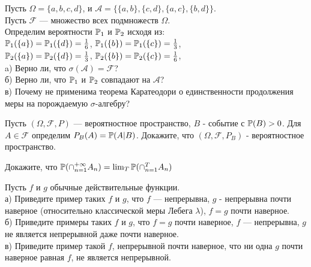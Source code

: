\begin{problem}
Пусть $\Omega=\{a,b,c,d\}$, и
$\mathcal{A}=\{\{a,b\},\{c,d\},\{a,c\},\{b,d\}\}$. \\
Пусть $\mathcal{F}$ --- множество всех подмножеств $\Omega$. \\
Определим вероятности $\P_{1}$ и $\P_{2}$ исходя
из: \\
$\P_{1}(\{a\})=\P_{1}(\{d\})=\frac{1}{6}$,
$\P_{1}(\{b\})=\P_{1}(\{c\})=\frac{1}{3}$, \\
$\P_{2}(\{a\})=\P_{2}(\{d\})=\frac{1}{3}$,
$\P_{2}(\{b\})=\P_{2}(\{c\})=\frac{1}{6}$, \\
a) Верно ли, что $\sigma(\mathcal{A})=\mathcal{F}$? \\
б) Верно ли, что $\P_{1}$ и $\P_{2}$ совпадают на
$\mathcal{A}$? \\
в) Почему не применима теорема Каратеодори о единственности
продолжения меры на порождаемую $\sigma$-алгебру? 
\end{problem} 
\begin{solution} 

\end{solution}

\begin{problem}
Пусть $(\Omega,\mathcal{F},P)$ --- вероятностное пространство, $B$ -
событие с $\P(B)>0$. Для $A\in \mathcal{F}$ определим
$P_{B}(A)=\P(A|B)$. Докажите, что $(\Omega,\mathcal{F},P_{B})$ -
вероятностное пространство. 
\end{problem} 
\begin{solution} 

\end{solution}

\begin{problem}
Докажите, что
$\P(\cap_{n=1}^{+\infty}A_{n})=\lim_{T}\P(\cap_{n=1}^{T}A_{n})$ 
\end{problem} 
\begin{solution} 

\end{solution}

\begin{problem}
Пусть $f$ и $g$ обычные действительные функции. \\
а) Приведите пример таких $f$ и $g$, что $f$ --- непрерывна, $g$ -
непрерывна почти наверное (относительно
классической меры Лебега $\lambda$), $f=g$ почти наверное. \\
б) Приведите примеры таких $f$ и $g$, что $f=g$ почти наверное,
$f$ --- непрерывна, $g$ не является непрерывной даже почти наверное. \\
в) Приведите пример такой $f$, непрерывной почти наверное, что ни
одна $g$ почти наверное равная $f$, не является непрерывной. 
\end{problem} 
\begin{solution} 

\end{solution}

